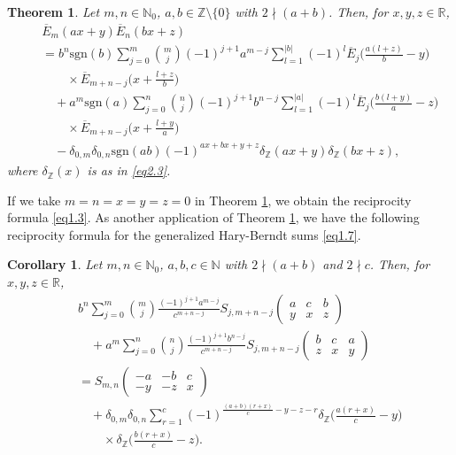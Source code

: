 \documentclass[reqno]{amsart}
\numberwithin{equation}{section}
\newtheorem{theorem}[thm]{Theorem}
\newtheorem{corollary}[thm]{Corollary}
\begin{document}
\begin{theorem}\label{thm2.10} Let $m,n\in\mathbb{N}_{0}$, $a,b\in\mathbb{Z}\setminus\{0\}$ with $2\nmid (a+b)$. Then, for $x,y,z\in\mathbb{R}$,
\begin{eqnarray}\label{eq2.22}
&&\overline{E}_{m}(ax+y)\overline{E}_{n}(bx+z)\nonumber\\
&&=b^{n}\mathrm{sgn}(b)
\sum_{j=0}^{m}\binom{m}{j}(-1)^{j+1}a^{m-j}\sum_{l=1}^{|b|}(-1)^{l}
\overline{E}_{j}\biggl(\frac{a(l+z)}{b}-y\biggl)\nonumber\\
&&\qquad\times\overline{E}_{m+n-j}\biggl(x+\frac{l+z}{b}\biggl)\nonumber\\
&&\quad+a^{m}\mathrm{sgn}(a)\sum_{j=0}^{n}\binom{n}{j}(-1)^{j+1}b^{n-j}
\sum_{l=1}^{|a|}(-1)^{l}\overline{E}_{j}\biggl(\frac{b(l+y)}{a}-z\biggl)\nonumber\\
&&\qquad\times\overline{E}_{m+n-j}\biggl(x+\frac{l+y}{a}\biggl)\nonumber\\
&&\quad-\delta_{0,m}\delta_{0,n}\mathrm{sgn}(ab)(-1)^{ax+bx+y+z}\delta_{\mathbb{Z}}(ax+y)\delta_{\mathbb{Z}}(bx+z),
\end{eqnarray}
where $\delta_{\mathbb{Z}}(x)$ is as in \eqref{eq2.3}.
\end{theorem}

If we take $m=n=x=y=z=0$ in Theorem \ref{thm2.10}, we obtain the reciprocity formula \eqref{eq1.3}.
As another application of Theorem \ref{thm2.10}, we have the following reciprocity formula for the generalized Hary-Berndt sums \eqref{eq1.7}.

\begin{corollary}\label{cor2.11} Let $m,n\in\mathbb{N}_{0}$, $a,b,c\in\mathbb{N}$ with $2\nmid (a+b)$ and $2\nmid c$. Then, for $x,y,z\in\mathbb{R}$,
\begin{eqnarray}\label{eq2.23}
&&b^{n}\sum_{j=0}^{m}\binom{m}{j}\frac{(-1)^{j+1}a^{m-j}}{c^{m+n-j}}S_{j,m+n-j}\left(
\begin{matrix}
a & c & b \\
y & x & z
\end{matrix}
\right)\nonumber\\
&&\quad+a^{m}\sum_{j=0}^{n}\binom{n}{j}\frac{(-1)^{j+1}b^{n-j}}{c^{m+n-j}}S_{j,m+n-j}\left(
\begin{matrix}
b & c & a \\
z & x & y
\end{matrix}
\right)\nonumber\\
&&=S_{m,n}\left(
\begin{matrix}
-a & -b & c \\
-y & -z & x
\end{matrix}
\right)\nonumber\\
&&\quad+\delta_{0,m}\delta_{0,n}\sum_{r=1}^{c}(-1)^{\frac{(a+b)(r+x)}{c}-y-z-r}\delta_{\mathbb{Z}}\biggl(\frac{a(r+x)}{c}-y\biggl)\nonumber\\
&&\qquad\times\delta_{\mathbb{Z}}\biggl(\frac{b(r+x)}{c}-z\biggl).
\end{eqnarray}
\end{corollary}
\end{document}
